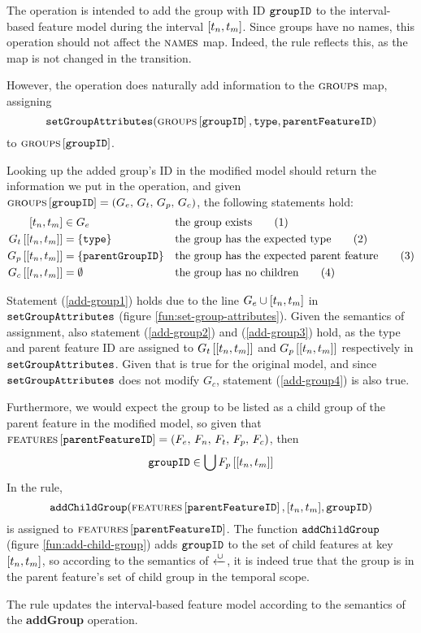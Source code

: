 The operation is intended to add the group with ID $\texttt{groupID}$ to the interval-based feature model during the interval $\interval{t_n}{t_m}$. Since groups have no names, this operation should not affect the $\textsc{names}{}$ map. Indeed, the rule reflects this, as the map is not changed in the transition.

However, the operation does naturally add information to the $\textsc{groups}{}{}$ map, assigning
\begin{equation*}
   \texttt{setGroupAttributes}( \textsc{groups}{}{} \left[ \texttt{groupID} \right], \texttt{type}, 
   \texttt{parentFeatureID} )
\end{equation*}
to $\textsc{groups}{} \left[ \texttt{groupID} \right]$.

Looking up the added group's ID in the modified model should return the information we put in the operation, and given $\textsc{groups}{} \left[ \texttt{groupID} \right] = \left(G_e,\, G_t,\, G_p,\, G_c\right)$, the following statements hold:
\begin{align}
   \interval{t_n}{t_m} &\in G_e && \text{the group exists} \tag{1} \label{add-group1}\\
   \lookup{G_t}{\interval{t_n}{t_m}} &= \set{\var{type}}  && \text{the group has the expected type} \tag{2} \label{add-group2}\\
   \lookup{G_p}{\interval{t_n}{t_m}} &= \set{\var{parentGroupID}}  && \text{the group has the expected parent feature} \tag{3} \label{add-group3}\\
   \lookup{G_c}{\interval{t_n}{t_m}} &= \emptyset && \text{the group has no children} \tag{4} \label{add-group4}
\end{align}

Statement (\ref{add-group1}) holds due to the line $G_e \cup \interval{t_n}{t_m}$ in $\texttt{setGroupAttributes}$ (figure \vref{fun:set-group-attributes}). Given the semantics of assignment, also statement (\ref{add-group2}) and (\ref{add-group3}) hold, as the type and parent feature ID are assigned to $\lookup{G_t}{\interval{t_n}{t_m}}$ and $\lookup{G_p}{\interval{t_n}{t_m}}$ respectively in $\texttt{setGroupAttributes}$. Given that  is true for the original model, and since $\texttt{setGroupAttributes}$ does not modify $G_c$, statement (\ref{add-group4}) is also true.

Furthermore, we would expect the group to be listed as a child group of the parent feature in the modified model, so given that $\textsc{features}{} \left[ \texttt{parentFeatureID} \right] = \left(F_e,\, F_n,\, F_t,\, F_p,\, F_c\right)$, then
\begin{equation*}
   \var{groupID} \in \bigcup \lookup{F_p}{\interval{t_n}{t_m}}
\end{equation*}
In the  rule, 
\[\var{addChildGroup}(\lookup{\features}{\var{parentFeatureID}}, \interval{t_n}{t_m}, \var{groupID})\]
is assigned to $\textsc{features} \left[ \texttt{parentFeatureID} \right]$. The function $\texttt{addChildGroup}$ (figure \vref{fun:add-child-group}) adds $\texttt{groupID}$ to the set of child features at key $\interval{t_n}{t_m}$, so according to the semantics of $\xleftarrow{\cup}$, it is indeed true that the group is in the parent feature's set of child group in the temporal scope.
\\

\begin{lemma}
   The  rule updates the interval-based feature model according to the semantics of the \textbf{addGroup} operation.
   \label{lemma:add-group-mod}
\end{lemma}

